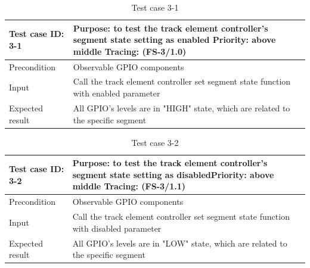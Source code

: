 \begin{table}[H]
	\caption{Test case 3-1}
	\label{table:TCase-FS3-1}
	\begin{center}
		\renewcommand{\arraystretch}{1.8}
		\begin{tabu} 
			to 0.9 \textwidth
			{  X[0.4, c] X[c] }
			\toprule
			Test case ID: 3-1 & Purpose: to test the track element controller's segment state setting as enabled \newline Priority: above middle \newline Tracing: (FS-3/1.0)\\ \midrule
			Precondition & Observable GPIO components \\
			Input & Call the track element controller set segment state function with enabled parameter  \\
			Expected result & All GPIO's levels are in "HIGH" state, which are related to the specific segment \\ \bottomrule
		\end{tabu}
	\end{center}
\end{table}

\begin{table}[H]
	\caption{Test case 3-2}
	\label{table:TCase-FS3-2}
	\begin{center}
		\renewcommand{\arraystretch}{1.8}
		\begin{tabu} 
			to 0.9 \textwidth
			{  X[0.4, c] X[c] }
			\toprule
			Test case ID: 3-2 & Purpose: to test the track element controller's segment state setting as disabled\newline Priority: above middle \newline Tracing: (FS-3/1.1)\\ \midrule
			Precondition & Observable GPIO components \\
			Input & Call the track element controller set segment state function with disabled parameter  \\
			Expected result & All GPIO's levels are in "LOW" state, which are related to the specific segment \\ \bottomrule
		\end{tabu}
	\end{center}
\end{table} 

